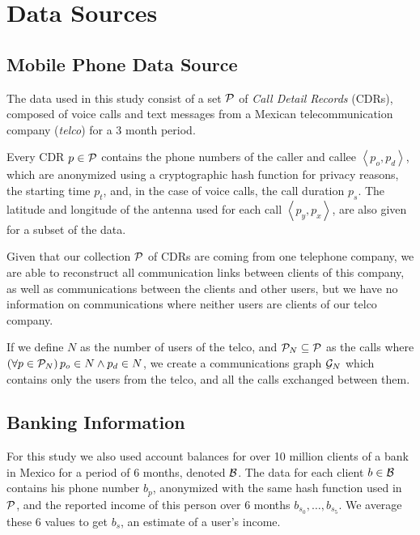 \section{Data Sources}\label{data_sources}

\subsection{Mobile Phone Data Source}

The data used in this study consist of a set $\mathcal{P}$ of \textit{Call Detail Records} (CDRs), composed of voice calls and text messages from a Mexican telecommunication company (\textit{telco}) for a 3 month period.

Every CDR $p \in \mathcal{P}$ contains the phone numbers of the caller and callee $\left< p_o, p_d \right>$, which are anonymized using a cryptographic hash function for privacy reasons, the starting time $p_t$, and, in the case of voice calls, the call duration $p_s$. The latitude and longitude of the antenna used for each call $\left< p_y, p_x \right>$, are also given for a subset of the data.

Given that our collection $\mathcal{P}$ of CDRs are coming from one telephone company, we are able to reconstruct all communication links between clients of this company, as well as communications between the clients and other users, but we have no information on communications where neither users are clients of our telco company.

If we define $N$ as the number of users of the telco, and $\mathcal{P}_N \subseteq \mathcal{P}$ as the calls where $\left( \forall p \in \mathcal{P}_N \right) p_o \in N \wedge p_d \in N$, we create a communications graph $\mathcal{G}_N$ which contains only the users from the telco, and all the calls exchanged between them.


\subsection{Banking Information}

For this study we also used account balances for over 10 million clients of a bank in Mexico for a period of 6 months, denoted $\mathcal{B}$. The data for each client $b \in \mathcal{B}$ contains his phone number $b_p$, anonymized with the same hash function used in $\mathcal{P}$, and the reported income of this person over 6 months $b_{s_0}, \ldots, b_{s_5}$. We average these 6 values to get $b_s$, an estimate of a user's income.


